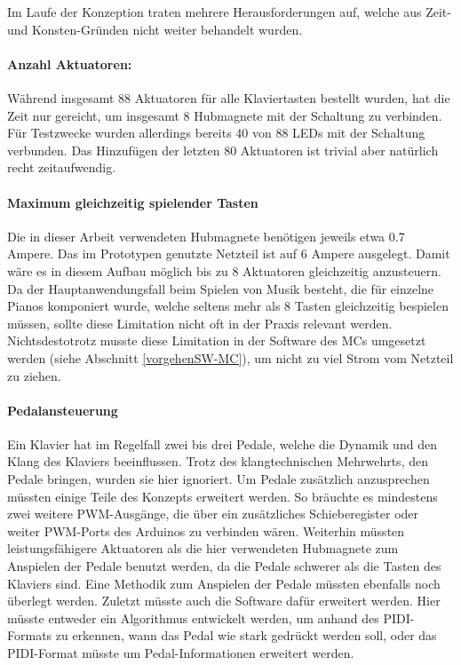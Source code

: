 Im Laufe der Konzeption traten mehrere Herausforderungen auf, welche aus Zeit- und Konsten-Gründen nicht weiter behandelt wurden.

\paragraph{Anzahl Aktuatoren:}
Während insgesamt 88 Aktuatoren für alle Klaviertasten bestellt wurden, hat die Zeit nur gereicht, um insgesamt 8 Hubmagnete mit der Schaltung zu verbinden.
Für Testzwecke wurden allerdings bereits 40 von 88 LEDs mit der Schaltung verbunden.
Das Hinzufügen der letzten 80 Aktuatoren ist trivial aber natürlich recht zeitaufwendig.

\paragraph{Maximum gleichzeitig spielender Tasten}
Die in dieser Arbeit verwendeten Hubmagnete benötigen jeweils etwa 0.7 Ampere.
Das im Prototypen genutzte Netzteil ist auf 6 Ampere ausgelegt.
Damit wäre es in diesem Aufbau möglich bis zu 8 Aktuatoren gleichzeitig anzusteuern.
Da der Hauptanwendungsfall beim Spielen von Musik besteht, die für einzelne Pianos komponiert wurde, welche seltens mehr als 8 Tasten gleichzeitig bespielen müssen, sollte diese Limitation nicht oft in der Praxis relevant werden.
Nichtsdestotrotz musste diese Limitation in der Software des \ac{MC}s umgesetzt werden (siehe Abschnitt \ref{vorgehenSW-MC}), um nicht zu viel Strom vom Netzteil zu ziehen.

\paragraph{Pedalansteuerung}
Ein Klavier hat im Regelfall zwei bis drei Pedale, welche die Dynamik und den Klang des Klaviers beeinflussen.
Trotz des klangtechnischen Mehrwehrts, den Pedale bringen, wurden sie hier ignoriert.
Um Pedale zusätzlich anzusprechen müssten einige Teile des Konzepts erweitert werden.
So bräuchte es mindestens zwei weitere \ac{PWM}-Ausgänge, die über ein zusätzliches Schieberegister oder weiter \ac{PWM}-Ports des Arduinos zu verbinden wären.
Weiterhin müssten leistungsfähigere Aktuatoren als die hier verwendeten Hubmagnete zum Anspielen der Pedale benutzt werden, da die Pedale schwerer als die Tasten des Klaviers sind.
Eine Methodik zum Anspielen der Pedale müssten ebenfalls noch überlegt werden.
Zuletzt müsste auch die Software dafür erweitert werden.
Hier müsste entweder ein Algorithmus entwickelt werden, um anhand des \ac{PIDI}-Formats zu erkennen, wann das Pedal wie stark gedrückt werden soll, oder das \ac{PIDI}-Format müsste um Pedal-Informationen erweitert werden.

